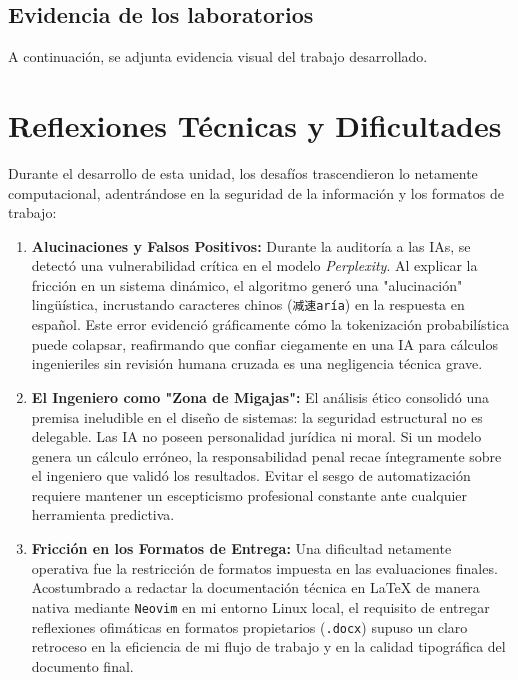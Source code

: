 \subsection{Evidencia de los laboratorios}

A continuación, se adjunta evidencia visual del trabajo desarrollado.

\newpage

\section{Reflexiones Técnicas y Dificultades}

Durante el desarrollo de esta unidad, los desafíos trascendieron lo netamente computacional, adentrándose en la seguridad de la información y los formatos de trabajo:

\begin{enumerate}
	\item \textbf{Alucinaciones y Falsos Positivos:} Durante la auditoría a las IAs, se detectó una vulnerabilidad crítica en el modelo \textit{Perplexity}. Al explicar la fricción en un sistema dinámico, el algoritmo generó una "alucinación" lingüística, incrustando caracteres chinos (\texttt{减速aría}) en la respuesta en español. Este error evidenció gráficamente cómo la tokenización probabilística puede colapsar, reafirmando que confiar ciegamente en una IA para cálculos ingenieriles sin revisión humana cruzada es una negligencia técnica grave.

	\item \textbf{El Ingeniero como "Zona de Migajas":} El análisis ético consolidó una premisa ineludible en el diseño de sistemas: la seguridad estructural no es delegable. Las IA no poseen personalidad jurídica ni moral. Si un modelo genera un cálculo erróneo, la responsabilidad penal recae íntegramente sobre el ingeniero que validó los resultados. Evitar el sesgo de automatización requiere mantener un escepticismo profesional constante ante cualquier herramienta predictiva.

	\item \textbf{Fricción en los Formatos de Entrega:} Una dificultad netamente operativa fue la restricción de formatos impuesta en las evaluaciones finales. Acostumbrado a redactar la documentación técnica en \LaTeX{} de manera nativa mediante \texttt{Neovim} en mi entorno Linux local, el requisito de entregar reflexiones ofimáticas en formatos propietarios (\texttt{.docx}) supuso un claro retroceso en la eficiencia de mi flujo de trabajo y en la calidad tipográfica del documento final.
\end{enumerate}

